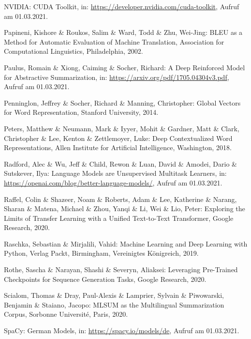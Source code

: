 \begin{thebibliography}{85}
NVIDIA: CUDA Toolkit, in: \url{https://developer.nvidia.com/cuda-toolkit}, Aufruf am 01.03.2021.

Papineni, Kishore \& Roukos, Salim \& Ward, Todd \& Zhu, Wei-Jing: BLEU as a Method for Automatic Evaluation of Machine Translation, Association for Computational Linguistics, Philadelphia, 2002.

Paulus, Romain \& Xiong, Caiming \& Socher, Richard: A Deep Reinforced Model for Abstractive Summarization, in: \url{https://arxiv.org/pdf/1705.04304v3.pdf}, Aufruf am 01.03.2021.

Penninglon, Jeffrey \& Socher, Richard \& Manning, Christopher: Global Vectors for Word Representation, Stanford University, 2014.

Peters, Matthew \& Neumann, Mark \& Iyyer, Mohit \& Gardner, Matt \& Clark, Christopher \& Lee, Kenton \& Zettlemoyer, Luke: Deep Contextualized Word Representations, Allen Institute for Artificial Intelligence, Washington, 2018.

Radford, Alec \& Wu, Jeff \& Child, Rewon \& Luan, David \& Amodei, Dario \& Sutskever, Ilya: Language Models are Unsupervised Multitask Learners, in: \url{https://openai.com/blog/better-language-models/}, Aufruf am 01.03.2021.

Raffel, Colin \& Shazeer, Noam \& Roberts, Adam \& Lee, Katherine \& Narang, Sharan \& Matena, Michael \& Zhou, Yanqi \& Li, Wei \& Lio, Peter: Exploring the Limits of Transfer Learning with a Unified Text-to-Text Transformer, Google Research, 2020.

Raschka, Sebastian \& Mirjalili, Vahid: Machine Learning and Deep Learning with Python, Verlag Packt, Birmingham, Vereinigtes Königreich, 2019.

Rothe, Sascha \& Narayan, Shashi \& Severyn, Aliaksei: Leveraging Pre-Trained Checkpoints for Sequence Generation Tasks, Google Research, 2020.

Scialom, Thomas \& Dray, Paul-Alexis \& Lamprier, Sylvain \& Piwowarski, Benjamin \& Staiano, Jacopo: MLSUM as the Multilingual Summarization Corpus, Sorbonne Université, Paris, 2020.

SpaCy: German Models, in: \url{https://spacy.io/models/de}, Aufruf am 01.03.2021.


\end{thebibliography}
